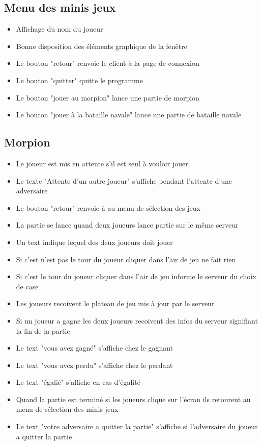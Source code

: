 \documentclass{report}
\begin{document}
\subsection{Menu des minis jeux}
\begin{itemize}
  \item Affichage du nom du joueur
  \item Bonne disposition des éléments graphique de la fenêtre
  \item Le bouton "retour" renvoie le client à la page de connexion
  \item Le bouton "quitter" quitte le programme
  \item Le bouton "jouer au morpion" lance une partie de morpion
  \item Le bouton "jouer à la bataille navale" lance une partie de bataille navale
\end{itemize}

\subsection{Morpion}
\begin{itemize}
  \item Le joueur est mis en attente s'il est seul à vouloir jouer
  \item Le texte "Attente d'un autre joueur" s'affiche pendant l'attente d'une adversaire
  \item Le bouton "retour" renvoie à au menu de sélection des jeux
  \item La partie se lance quand deux joueurs lance partie sur le même serveur
  \item Un text indique lequel des deux joueurs doit jouer
  \item Si c'est n'est pas le tour du joueur cliquer dans l'air de jeu ne fait rien
  \item Si c'est le tour du joueur cliquer dans l'air de jeu informe le serveur du choix de case
  \item Les joueurs recoivent le plateau de jeu mis à jour par le serveur
  \item Si un joueur a gagne les deux joueurs recoivent des infos du serveur signifiant la fin de la partie
  \item Le text "vous avez gagné" s'affiche chez le gagnant
  \item Le text "vous avez perdu" s'affiche chez le perdant
  \item Le text "égalié" s'affiche en cas d'égalité
  \item Quand la partie est terminé si les joueurs clique sur l'écran ils retourent au menu de sélection des minis jeux
  \item Le text "votre adversaire a quitter la partie" s'affiche si l'adversaire du joueur a quitter la partie
\end{itemize}
\end{document}

